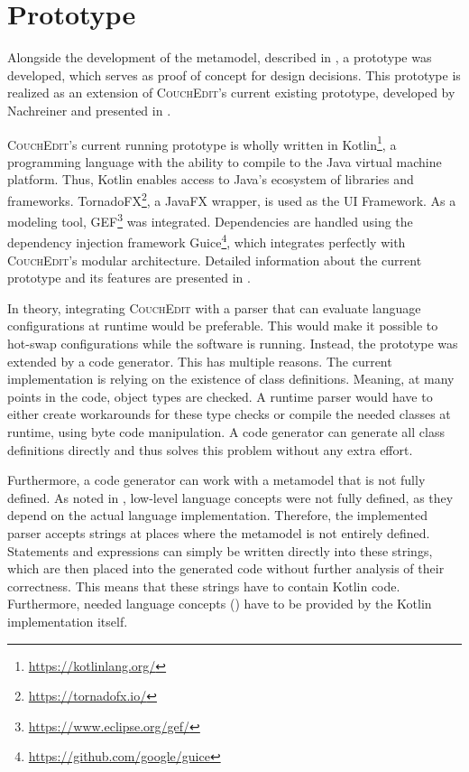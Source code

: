 \chapter{Prototype}
\label{ch:prototype}
Alongside the development of the metamodel, described in , a prototype was developed, which serves as proof of concept for design decisions. This prototype is realized as an extension of \textsc{CouchEdit}'s current existing prototype, developed by Nachreiner and presented in \cite{nachreiner_couchedit_2020}.

\textsc{CouchEdit}'s current running prototype is wholly written in Kotlin\footnote{\url{https://kotlinlang.org/}}, a programming language with the ability to compile to the Java virtual machine platform. Thus, Kotlin enables access to Java's ecosystem of libraries and frameworks. TornadoFX\footnote{\url{https://tornadofx.io/}}, a JavaFX wrapper, is used as the UI Framework. As a modeling tool, GEF\footnote{\url{https://www.eclipse.org/gef/}} was integrated. Dependencies are handled using the dependency injection framework Guice\footnote{\url{https://github.com/google/guice}}, which integrates perfectly with \textsc{CouchEdit}'s modular architecture. Detailed information about the current prototype and its features are presented in \cite{nachreiner_couchedit_2020}.

In theory, integrating \textsc{CouchEdit} with a parser that can evaluate language configurations at runtime would be preferable. This would make it possible to hot-swap configurations while the software is running. Instead, the prototype was extended by a code generator. This has multiple reasons. The current implementation is relying on the existence of class definitions. Meaning, at many points in the code, object types are checked. A runtime parser would have to either create workarounds for these type checks or compile the needed classes at runtime, using byte code manipulation. A code generator can generate all class definitions directly and thus solves this problem without any extra effort. 

Furthermore, a code generator can work with a metamodel that is not fully defined. As noted in , low-level language concepts were not fully defined, as they depend on the actual language implementation. Therefore, the implemented parser accepts strings at places where the metamodel is not entirely defined. Statements and expressions can simply be written directly into these strings, which are then placed into the generated code without further analysis of their correctness. This means that these strings have to contain Kotlin code. Furthermore, needed language concepts () have to be provided by the Kotlin implementation itself.

